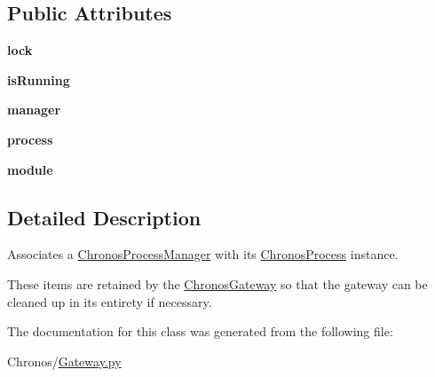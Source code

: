 \subsection*{Public Attributes}
\begin{DoxyCompactItemize}
\item 
{\bfseries lock}
\item 
{\bfseries is\+Running}
\item 
{\bfseries manager}
\item 
{\bfseries process}
\item 
{\bfseries module}
\end{DoxyCompactItemize}


\subsection{Detailed Description}
Associates a \hyperlink{classChronos_1_1Gateway_1_1ChronosProcessManager}{Chronos\+Process\+Manager} with its \hyperlink{classChronos_1_1Gateway_1_1ChronosProcess}{Chronos\+Process} instance. 

These items are retained by the \hyperlink{classChronos_1_1Gateway_1_1ChronosGateway}{Chronos\+Gateway} so that the gateway can be cleaned up in its entirety if necessary. 

The documentation for this class was generated from the following file\+:\begin{DoxyCompactItemize}
\item 
Chronos/\hyperlink{Gateway_8py}{Gateway.\+py}\end{DoxyCompactItemize}
